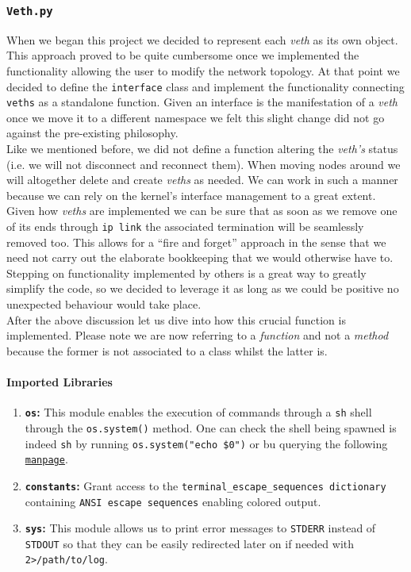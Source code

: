 \subsubsection{\texttt{Veth.py}}
    When we began this project we decided to represent each \textit{veth} as its own object. This approach proved to be quite cumbersome once we implemented the functionality allowing the user to modify the network topology. At that point we decided to define the \texttt{interface} class and implement the functionality connecting \texttt{veths} as a standalone function. Given an interface is the manifestation of a \textit{veth} once we move it to a different namespace we felt this slight change did not go against the pre-existing philosophy.\\

    Like we mentioned before, we did not define a function altering the \textit{veth's} status (i.e. we will not disconnect and reconnect them). When moving nodes around we will altogether delete and create \textit{veths} as needed. We can work in such a manner because we  can rely on the kernel's interface management to a great extent. Given how \textit{veths} are implemented we can be sure that as soon as we remove one of its ends through \texttt{ip link} the associated termination will be seamlessly removed too. This allows for a ``fire and forget'' approach in the sense that we need not carry out the elaborate bookkeeping that we would otherwise have to. Stepping on functionality implemented by others is a great way to greatly simplify the code, so we decided to leverage it as long as we could be positive no unexpected behaviour would take place.\\

    After the above discussion let us dive into how this crucial function is implemented. Please note we are now referring to a \textit{function} and not a \textit{method} because the former is not associated to a class whilst the latter is.\\

    \paragraph{Imported Libraries}
        \begin{enumerate}
            \item \textbf{\texttt{os}:} This module enables the execution of commands through a \texttt{sh} shell through the \texttt{os.system()} method. One can check the shell being spawned is indeed \texttt{sh} by running \texttt{\allowbreak os.system("echo \$0")} or bu querying the following \href{https://linux.die.net/man/3/system}{\texttt{manpage}}.
            \item \textbf{\texttt{constants}:} Grant access to the \texttt{\allowbreak terminal\_escape\_sequences dictionary} containing \texttt{ANSI escape sequences} enabling colored output.
            \item \textbf{\texttt{sys}:} This module allows us to print error messages to \texttt{STDERR} instead of \texttt{STDOUT} so that they can be easily redirected later on if needed with \texttt{2>/path/to/log}.
        \end{enumerate}

